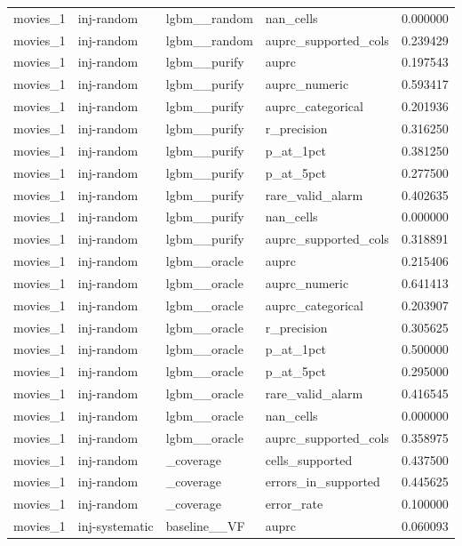\begin{tabular}{lllll}
movies\_1 & inj-random & lgbm\_\_random & nan\_cells & 0.000000 \\
movies\_1 & inj-random & lgbm\_\_random & auprc\_supported\_cols & 0.239429 \\
movies\_1 & inj-random & lgbm\_\_purify & auprc & 0.197543 \\
movies\_1 & inj-random & lgbm\_\_purify & auprc\_numeric & 0.593417 \\
movies\_1 & inj-random & lgbm\_\_purify & auprc\_categorical & 0.201936 \\
movies\_1 & inj-random & lgbm\_\_purify & r\_precision & 0.316250 \\
movies\_1 & inj-random & lgbm\_\_purify & p\_at\_1pct & 0.381250 \\
movies\_1 & inj-random & lgbm\_\_purify & p\_at\_5pct & 0.277500 \\
movies\_1 & inj-random & lgbm\_\_purify & rare\_valid\_alarm & 0.402635 \\
movies\_1 & inj-random & lgbm\_\_purify & nan\_cells & 0.000000 \\
movies\_1 & inj-random & lgbm\_\_purify & auprc\_supported\_cols & 0.318891 \\
movies\_1 & inj-random & lgbm\_\_oracle & auprc & 0.215406 \\
movies\_1 & inj-random & lgbm\_\_oracle & auprc\_numeric & 0.641413 \\
movies\_1 & inj-random & lgbm\_\_oracle & auprc\_categorical & 0.203907 \\
movies\_1 & inj-random & lgbm\_\_oracle & r\_precision & 0.305625 \\
movies\_1 & inj-random & lgbm\_\_oracle & p\_at\_1pct & 0.500000 \\
movies\_1 & inj-random & lgbm\_\_oracle & p\_at\_5pct & 0.295000 \\
movies\_1 & inj-random & lgbm\_\_oracle & rare\_valid\_alarm & 0.416545 \\
movies\_1 & inj-random & lgbm\_\_oracle & nan\_cells & 0.000000 \\
movies\_1 & inj-random & lgbm\_\_oracle & auprc\_supported\_cols & 0.358975 \\
movies\_1 & inj-random & \_coverage & cells\_supported & 0.437500 \\
movies\_1 & inj-random & \_coverage & errors\_in\_supported & 0.445625 \\
movies\_1 & inj-random & \_coverage & error\_rate & 0.100000 \\
movies\_1 & inj-systematic & baseline\_\_VF & auprc & 0.060093 \\

\end{tabular}
